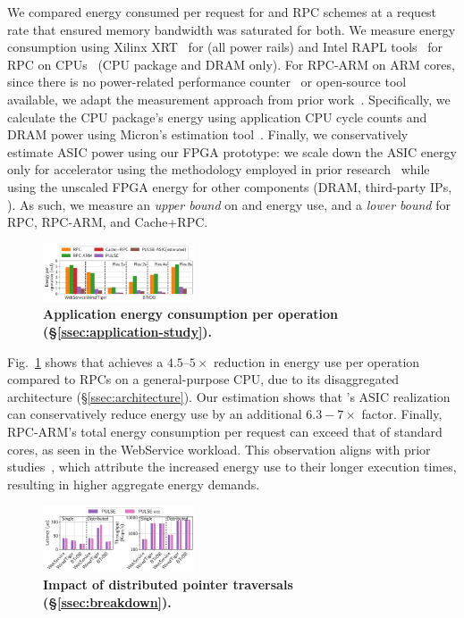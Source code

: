  We compared energy consumed per request for \pulse and RPC schemes at a request rate that ensured memory bandwidth was saturated for both. We measure energy consumption using Xilinx XRT~\cite{xilinx_xrt} for \pulse (all power rails) and Intel RAPL tools~\cite{intel_rapl} for RPC on CPUs~\cite{intelprocessor} (CPU package and DRAM only). For RPC-ARM on ARM cores, since there is no power-related performance counter~\cite{armv8registers} or open-source tool available, we adapt the measurement approach from prior work~\cite{clio}. Specifically, we calculate the CPU package's energy using application CPU cycle counts and DRAM power using Micron's estimation tool~\cite{micron}. Finally, we conservatively estimate ASIC power using our FPGA prototype: we scale down the ASIC energy only for \pulse accelerator using the methodology employed in prior research~\cite{asicpower} while using the unscaled FPGA energy for other components (DRAM, third-party IPs, \etc). As such, we measure an \emph{upper bound} on \pulse and \pulseasic energy use, and a \emph{lower bound} for RPC, RPC-ARM, and Cache+RPC.

\begin{figure}[t]
\centering
\includegraphics[width=0.4\textwidth]{fig/pulse/power.pdf}
\vspace{-1em}
\caption{\textbf{Application energy consumption per operation (\S\ref{ssec:application-study}).}}
\label{fig:eval_energy}%
\end{figure}

Fig.~\ref{fig:eval_energy} shows that \pulse achieves a $4.5$--$5\times$ reduction in energy use per operation compared to RPCs on a general-purpose CPU, due to its disaggregated architecture (\S\ref{ssec:architecture}). Our estimation shows that \pulse's ASIC realization can conservatively reduce energy use by an additional $6.3-7\times$ factor. 
Finally, RPC-ARM's total energy consumption per request can exceed that of standard cores, as seen in the WebService workload. This observation aligns with prior studies~\cite{clio}, which attribute the increased energy use to their longer execution times, resulting in higher aggregate energy demands.

\begin{figure}[t]
\centering
\includegraphics[width=0.4\textwidth]{fig/pulse/breakdown.pdf}%
\vspace{-1em}
\caption{\textbf{Impact of distributed pointer traversals (\S\ref{ssec:breakdown}).}}
\label{fig:eval_breakdown}
\end{figure}

